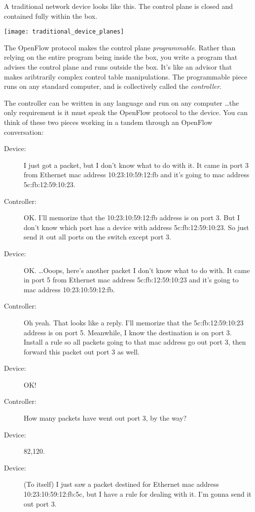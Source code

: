 A traditional network device looks like this. 
The control plane is closed and contained fully within the box.

\texttt{[image: traditional\_device\_planes]}

The OpenFlow protocol makes the control plane \textit{programmable}.
Rather than relying on the entire program being inside the box, you write a program that advises the control plane
and runs outside the box.
It's like an advisor that makes aribtrarily complex control table manipulations.  
The programmable piece runs on any standard computer, and is collectively called the \textit{controller}.  

The controller can be written in any language and run on any computer \ldots the only requirement is it must speak the
OpenFlow protocol to the device.  
You can think of these two pieces working in a tandem through an OpenFlow conversation:

\begin{description}
\item[Device:] I just got a packet, but I don't know what to do with it.
It came in port 3 from Ethernet mac address 10:23:10:59:12:fb and it's going to mac address 5c:fb:12:59:10:23.
\item[Controller:] OK.    
I'll memorize that the 10:23:10:59:12:fb address is on port 3.
But I don't know which port has a device with address 5c:fb:12:59:10:23.
So just send it out all ports on the switch except port 3.  
\item[Device:] OK. \ldots Ooops, here's another packet I don't know what to do with.  
It came in port 5 from Ethernet mac address 5c:fb:12:59:10:23 and it's going to mac address 10:23:10:59:12:fb.
\item[Controller:]  Oh yeah.  
That looks like a reply.  
I'll memorize that the 5c:fb:12:59:10:23 address is on port 5.
Meanwhile, I know the destination is on port 3.  
Install a rule so all packets going to that mac address go out port 3, then forward this packet out port 3 as well.  
\item[Device:] OK!
\item[Controller:] How many packets have went out port 3, by the way?
\item[Device:] 82,120.
\item[Device:] (To itself) I just saw a packet destined for Ethernet mac address 10:23:10:59:12:fb:5c, but I have a rule for dealing with it.  I'm gonna send it out port 3.  
\end{description}

